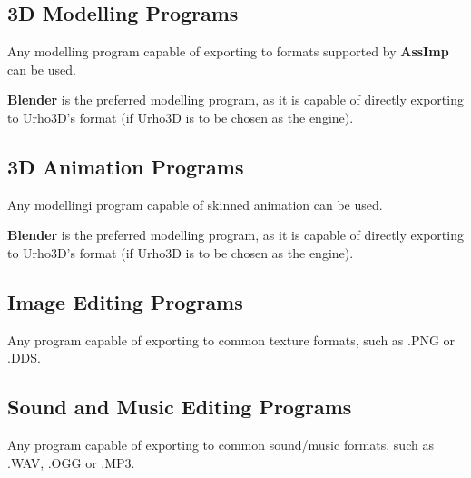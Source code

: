 \subsection{3D Modelling Programs}

Any   modelling   program   capable   of   exporting  to  formats  supported  by
\textbf{AssImp} can be used.

\textbf{Blender}  is  the  preferred  modelling  program, as it  is  capable  of
directly exporting to Urho3D's format (if Urho3D is to be chosen as the engine).


\subsection{3D Animation Programs}

Any modellingi program capable of skinned animation can be used.

\textbf{Blender}  is  the  preferred  modelling  program,  as  it  is capable of
directly exporting to Urho3D's format (if Urho3D is to be chosen as the engine).


\subsection{Image Editing Programs}

Any program capable of exporting to common texture formats, such as .PNG or .DDS.


\subsection{Sound and Music Editing Programs}

Any program capable of exporting to common sound/music formats, such as .WAV, .OGG or .MP3.

